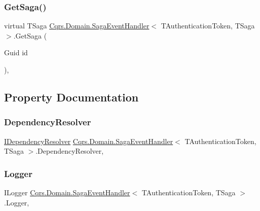 \subsubsection{\texorpdfstring{Get\+Saga()}{GetSaga()}}
{\footnotesize\ttfamily virtual T\+Saga \hyperlink{classCqrs_1_1Domain_1_1SagaEventHandler}{Cqrs.\+Domain.\+Saga\+Event\+Handler}$<$ T\+Authentication\+Token, T\+Saga $>$.Get\+Saga (\begin{DoxyParamCaption}\item[{Guid}]{id }\end{DoxyParamCaption})\hspace{0.3cm}{\ttfamily [protected]}, {\ttfamily [virtual]}}



\subsection{Property Documentation}
\mbox{\label{classCqrs_1_1Domain_1_1SagaEventHandler_ad7497b0e19703aa351e571427a072d0d_ad7497b0e19703aa351e571427a072d0d}} 
\subsubsection{\texorpdfstring{Dependency\+Resolver}{DependencyResolver}}
{\footnotesize\ttfamily \hyperlink{interfaceCqrs_1_1Configuration_1_1IDependencyResolver}{I\+Dependency\+Resolver} \hyperlink{classCqrs_1_1Domain_1_1SagaEventHandler}{Cqrs.\+Domain.\+Saga\+Event\+Handler}$<$ T\+Authentication\+Token, T\+Saga $>$.Dependency\+Resolver\hspace{0.3cm}{\ttfamily [get]}, {\ttfamily [protected]}}

\mbox{\label{classCqrs_1_1Domain_1_1SagaEventHandler_a06c2d4b3720bec78e9cea40cb0ed2ff3_a06c2d4b3720bec78e9cea40cb0ed2ff3}} 
\subsubsection{\texorpdfstring{Logger}{Logger}}
{\footnotesize\ttfamily I\+Logger \hyperlink{classCqrs_1_1Domain_1_1SagaEventHandler}{Cqrs.\+Domain.\+Saga\+Event\+Handler}$<$ T\+Authentication\+Token, T\+Saga $>$.Logger\hspace{0.3cm}{\ttfamily [get]}, {\ttfamily [protected]}}

